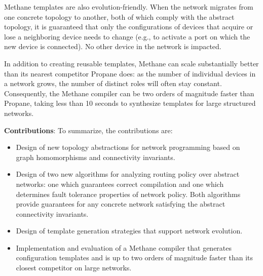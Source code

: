 \documentclass[numbers, 10pt, preprint]{sigplanconf}
\newcommand{\todo}[1]{\textcolor{red}{[TODO: #1]}}
\newcommand{\sysname}{{\small \sf Methane}\xspace}
\newcommand{\propane}{{\small \sf Propane}\xspace}
\begin{document}
\sysname templates are also evolution-friendly. When the network migrates from
one concrete topology to another, both of which comply with the abstract
topology, it is guaranteed that only the configurations of devices that acquire
or lose a neighboring device needs to change (e.g., to activate a port on which
the new device is connected).  No other device in the network is impacted.

In addition to creating reusable templates, 
\sysname can scale substantially better than its nearest competitor \propane does: as the number of individual devices in a
network grows, the number of distinct roles will often stay constant.
Consequently, the \sysname compiler can be two orders of magnitude
faster than \propane, taking less than 10 seconds to synthesize templates for large structured networks.



\vspace{1em}
\noindent
\textbf{Contributions}: To summarize, the contributions are:
%
\begin{itemize}[noitemsep,nolistsep,label={\large\textbullet}]
\item Design of new topology abstractions for network programming
based on graph homomorphisms and connectivity invariants.
\item Design of two new algorithms for analyzing routing policy over
abstract networks: one which
guarantees correct compilation and one which determines fault tolerance
properties of network policy.  Both algorithms provide guarantees for any
concrete network satisfying the abstract connectivity invariants.
\item Design of template generation strategies that support network
evolution.
\item Implementation and evaluation of a \sysname compiler that generates
configuration templates and is up to two orders of magnitude faster
than its closest competitor on large networks.
\end{itemize}


\end{document}
